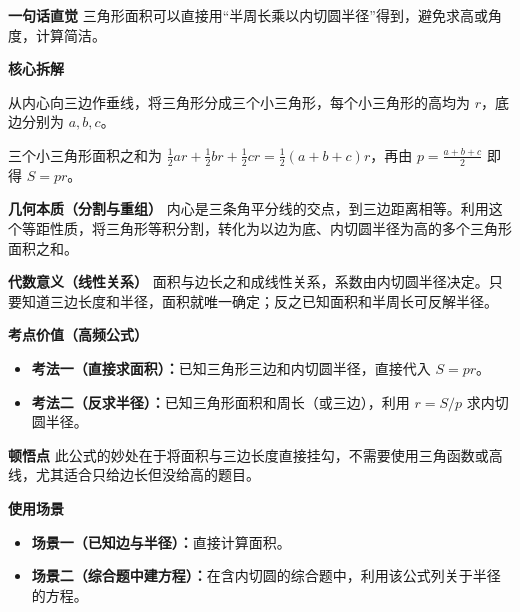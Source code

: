 \begin{explanationbox}
	\textbf{\textcolor{CExplanation}{一句话直觉}}
	三角形面积可以直接用“半周长乘以内切圆半径”得到，避免求高或角度，计算简洁。

	\medskip
	\textbf{\textcolor{CExplanation}{核心拆解}}
	\begin{description}[style=nextline, leftmargin=2.8em, labelsep=0.5em, itemsep=0.45em]
		\item[\textbf{要点一（分割求和）：}]
			从内心向三边作垂线，将三角形分成三个小三角形，每个小三角形的高均为 $r$，底边分别为 $a,b,c$。
		\item[\textbf{要点二（代数整理）：}]
			三个小三角形面积之和为 $\frac{1}{2}ar + \frac{1}{2}br + \frac{1}{2}cr = \frac{1}{2}(a+b+c)r$，再由 $p = \frac{a+b+c}{2}$ 即得 $S = pr$。
	\end{description}

	\medskip
	\textbf{\textcolor{CExplanation}{几何本质（分割与重组）}}
	内心是三条角平分线的交点，到三边距离相等。利用这个等距性质，将三角形等积分割，转化为以边为底、内切圆半径为高的多个三角形面积之和。

	\medskip
	\textbf{\textcolor{CExplanation}{代数意义（线性关系）}}
	面积与边长之和成线性关系，系数由内切圆半径决定。只要知道三边长度和半径，面积就唯一确定；反之已知面积和半周长可反解半径。

	\medskip
	\textbf{\textcolor{CExplanation}{考点价值（高频公式）}}
	\begin{itemize}[leftmargin=*, itemsep=0.5em, topsep=0.4em]
		\item \textbf{考法一（直接求面积）：}已知三角形三边和内切圆半径，直接代入 $S = pr$。
		\item \textbf{考法二（反求半径）：}已知三角形面积和周长（或三边），利用 $r = S/p$ 求内切圆半径。
	\end{itemize}

	\medskip
	\textbf{\textcolor{CExplanation}{顿悟点}}
	此公式的妙处在于将面积与三边长度直接挂勾，不需要使用三角函数或高线，尤其适合只给边长但没给高的题目。

	\medskip
	\textbf{\textcolor{CExplanation}{使用场景}}
	\begin{itemize}[leftmargin=*, itemsep=0.5em, topsep=0.4em]
		\item \textbf{场景一（已知边与半径）：}直接计算面积。
		\item \textbf{场景二（综合题中建方程）：}在含内切圆的综合题中，利用该公式列关于半径的方程。
	\end{itemize}

\end{explanationbox}
